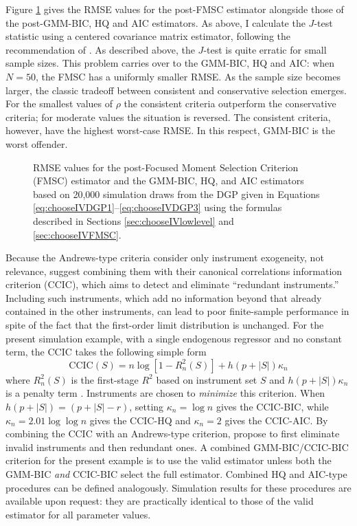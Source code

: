 Figure \ref{fig:chooseIVsim_RMSErelMSC} gives the RMSE values for the post-FMSC estimator alongside those of the post-GMM-BIC, HQ and AIC estimators.
As above, I calculate the $J$-test statistic using a centered covariance matrix estimator, following the recommendation of \cite{Andrews1999}.
As described above, the $J$-test is quite erratic for small sample sizes.
This problem carries over to the GMM-BIC, HQ and AIC: when $N = 50$, the FMSC has a uniformly smaller RMSE. 
As the sample size becomes larger, the classic tradeoff between consistent and conservative selection emerges.
For the smallest values of $\rho$ the consistent criteria outperform the conservative criteria; for moderate values the situation is reversed.
The consistent criteria, however, have the highest worst-case RMSE.
In this respect, GMM-BIC is the worst offender.
\begin{figure}
\centering
	
	\caption{RMSE values for the post-Focused Moment Selection Criterion (FMSC) estimator and the GMM-BIC, HQ, and AIC estimators based on 20,000 simulation draws from the DGP given in Equations \ref{eq:chooseIVDGP1}--\ref{eq:chooseIVDGP3} using the formulas described in Sections \ref{sec:chooseIVlowlevel} and \ref{sec:chooseIVFMSC}.}
	\label{fig:chooseIVsim_RMSErelMSC}
\end{figure}

Because the Andrews-type criteria consider only instrument exogeneity, not relevance, \cite{HallPeixe2003} suggest combining them with their canonical correlations information criterion (CCIC), which aims to detect and eliminate ``redundant instruments.''
Including such instruments, which add no information beyond that already contained in the other instruments, can lead to poor finite-sample performance in spite of the fact that the first-order limit distribution is unchanged.
For the present simulation example, with a single endogenous regressor and no constant term, the CCIC takes the following simple form
	\begin{equation}
	\mbox{CCIC}(S) = n \log\left[1 - R_n^2(S) \right] + h(p + |S|)\kappa_n
	\end{equation}
where $R_n^2(S)$ is the first-stage $R^2$ based on instrument set $S$ and $h(p + |S|)\kappa_n$ is a penalty term \citep{Jana2005}. 
Instruments are chosen to \emph{minimize} this criterion.
When $h(p + |S|) = (p + |S| - r)$, setting $\kappa_n = \log{n}$ gives the CCIC-BIC, while $\kappa_n = 2.01 \log{\log{n}}$ gives the CCIC-HQ and $\kappa_n = 2$ gives the CCIC-AIC.
By combining the CCIC with an Andrews-type criterion, \cite{HallPeixe2003} propose to first eliminate invalid instruments and then redundant ones.
A combined GMM-BIC/CCIC-BIC criterion for the present example is to use the valid estimator unless both the GMM-BIC \emph{and} CCIC-BIC select the full estimator.
Combined HQ and AIC-type procedures can be defined analogously.
Simulation results for these procedures are available upon request: they are practically identical to those of the valid estimator for all parameter values.
